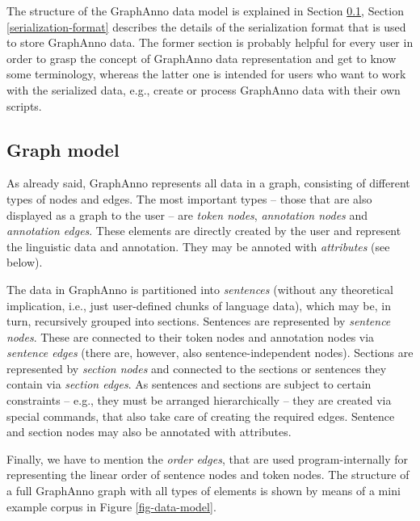 \documentclass[12pt]{scrartcl}
\begin{document}
The structure of the GraphAnno data model is explained in Section \ref{graph-model}, Section \ref{serialization-format} describes the details of the serialization format that is used to store GraphAnno data.
The former section is probably helpful for every user in order to grasp the concept of GraphAnno data representation and get to know some terminology, whereas the latter one is intended for users who want to work with the serialized data, e.g., create or process GraphAnno data with their own scripts.


\subsection{Graph model}\label{graph-model}

As already said, GraphAnno represents all data in a graph, consisting of different types of nodes and edges.
The most important types – those that are also displayed as a graph to the user – are \textit{token nodes}, \textit{annotation nodes} and \textit{annotation edges}.
These elements are directly created by the user and represent the linguistic data and annotation.
They may be annoted with \textit{attributes} (see below).

The data in GraphAnno is partitioned into \textit{sentences} (without any theoretical implication, i.e., just user-defined chunks of language data), which may be, in turn, recursively grouped into sections.
Sentences are represented by \textit{sentence nodes}.
These are connected to their token nodes and annotation nodes via \textit{sentence edges} (there are, however, also sentence-independent nodes).
Sections are represented by \textit{section nodes} and connected to the sections or sentences they contain via \textit{section edges}.
As sentences and sections are subject to certain constraints – e.g., they must be arranged hierarchically –  they are created via special commands, that also take care of creating the required edges.
Sentence and section nodes may also be annotated with attributes.

Finally, we have to mention the \textit{order edges}, that are used program-internally for representing the linear order of sentence nodes and token nodes.
The structure of a full GraphAnno graph with all types of elements is shown by means of a mini example corpus in Figure \ref{fig-data-model}.
\end{document}
